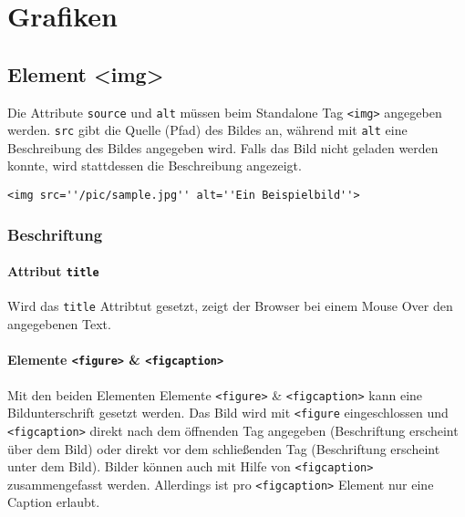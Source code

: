  \chapter{Grafiken}
\section{Element <img>}
Die Attribute \texttt{source} und \texttt{alt} müssen beim Standalone Tag \texttt{<img>} angegeben werden. \texttt{src} gibt die Quelle (Pfad) des Bildes an, während mit \texttt{alt} eine Beschreibung des Bildes angegeben wird. Falls das Bild nicht geladen werden konnte, wird stattdessen die Beschreibung angezeigt.\\[-1.5em]
 \begin{verbatim}
<img src=''/pic/sample.jpg'' alt=''Ein Beispielbild''>
\end{verbatim}
\subsection{Beschriftung}
\subsubsection{Attribut \texttt{title}}
Wird das \texttt{title} Attribtut gesetzt, zeigt der Browser bei einem Mouse Over den angegebenen Text.
\subsubsection{Elemente \texttt{<figure>} \& \texttt{<figcaption>}}
Mit den beiden Elementen Elemente \texttt{<figure>} \& \texttt{<figcaption>} kann eine Bildunterschrift gesetzt werden. Das Bild wird mit \texttt{<figure} eingeschlossen und \texttt{<figcaption>} direkt nach dem öffnenden Tag angegeben (Beschriftung erscheint über dem Bild) oder direkt vor dem schließenden Tag (Beschriftung erscheint unter dem Bild). Bilder können auch mit Hilfe von \texttt{<figcaption>} zusammengefasst werden. Allerdings ist pro \texttt{<figcaption>} Element nur eine Caption erlaubt.
